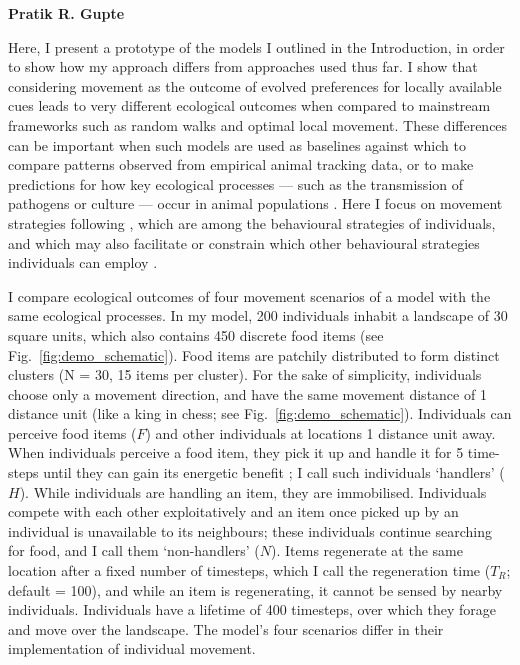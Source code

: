 
\pagestyle{plain}

\begingroup

\let\clearpage\relax
\let\cleardoublepage\relax
\let\cleardoublepage\relax

\begin{interludeenv}

\renewcommand\thefigure{\theinterludes-\arabic{figure}}
\setcounter{figure}{0}

\label{box:demos}

\noindent \textbf{Pratik R. Gupte}

\medskip

Here, I present a prototype of the models I outlined in the Introduction, in order to show how my approach differs from approaches used thus far.
I show that considering movement as the outcome of evolved preferences for locally available cues leads to very different ecological outcomes when compared to mainstream frameworks such as random walks and optimal local movement.
These differences can be important when such models are used as baselines against which to compare patterns observed from empirical animal tracking data, or to make predictions for how key ecological processes --- such as the transmission of pathogens or culture --- occur in animal populations \parencite{cantor2021}.
Here I focus on movement strategies following \textcite{bastille-rousseau2019}, which are among the behavioural strategies of individuals, and which may also facilitate or constrain which other behavioural strategies individuals can employ \citep{nathan2008a,spiegel2017}.

I compare ecological outcomes of four movement scenarios of a model with the same ecological processes.
In my model, 200 individuals inhabit a landscape of 30 square units, which also contains 450 discrete food items (see Fig.~\ref{fig:demo_schematic}).
Food items are patchily distributed to form distinct clusters (N = 30, 15 items per cluster).
For the sake of simplicity, individuals choose only a movement direction, and have the same movement distance of 1 distance unit (like a king in chess; see Fig.~\ref{fig:demo_schematic}).
Individuals can perceive food items ($F$) and other individuals at locations 1 distance unit away.
When individuals perceive a food item, they pick it up and handle it for 5 time-steps until they can gain its energetic benefit \citep{ruxton1992,gupte2021a,gupte2022c}; I call such individuals `handlers' ($H$).
While individuals are handling an item, they are immobilised.
Individuals compete with each other exploitatively and an item once picked up by an individual is unavailable to its neighbours; these individuals continue searching for food, and I call them `non-handlers' ($N$).
Items regenerate at the same location after a fixed number of timesteps, which I call the regeneration time ($T_R$; default = 100), and while an item is regenerating, it cannot be sensed by nearby individuals.
Individuals have a lifetime of 400 timesteps, over which they forage and move over the landscape.
The model's four scenarios differ in their implementation of individual movement.


\end{interludeenv}
